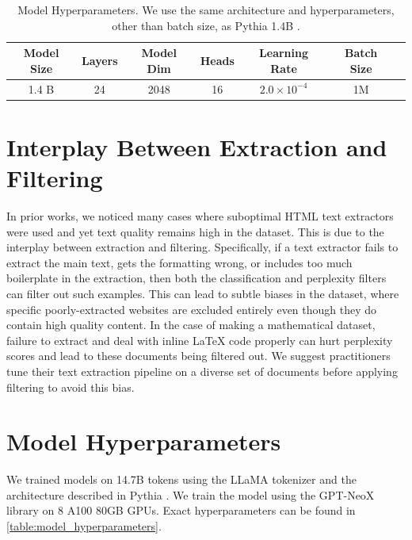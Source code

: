 \begin{table}[t!]
    \centering
    \begin{tabular}{ccccccc}
        \toprule
        Model Size & Layers & Model Dim & Heads & Learning Rate & Batch Size \\
        \midrule
        1.4 B & 24 & 2048 & 16 & $2.0 \times 10^{-4}$ & 1M \\
        \bottomrule
    \end{tabular}
    \caption{Model Hyperparameters. We use the same architecture and hyperparameters, other than batch size, as Pythia 1.4B \citep{pythia}.}
    \label{table:model_hyperparameters}
\end{table}



\section{Interplay Between Extraction and Filtering}

In prior works, we noticed many cases where suboptimal HTML text extractors were used and yet text quality remains high in the dataset. This is due to the interplay between extraction and filtering. Specifically, if a text extractor fails to extract the main text, gets the formatting wrong, or includes too much boilerplate in the extraction, then both the classification and perplexity filters can filter out such examples. This can lead to subtle biases in the dataset, where specific poorly-extracted websites are excluded entirely even though they do contain high quality content. In the case of making a mathematical dataset, failure to extract and deal with inline \LaTeX{} code properly can hurt perplexity scores and lead to these documents being filtered out. We suggest practitioners tune their text extraction pipeline on a diverse set of documents before applying filtering to avoid this bias.

\section{Model Hyperparameters}

We trained models on 14.7B tokens using the LLaMA \citep{llama2} tokenizer and the architecture described in Pythia \citep{pythia}. We train the model using the GPT-NeoX library \citep{gpt-neox-library} on 8 A100 80GB GPUs. Exact hyperparameters can be found in \autoref{table:model_hyperparameters}.

